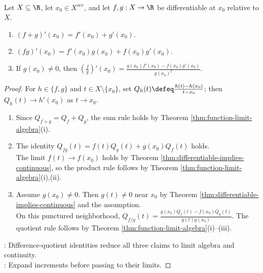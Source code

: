 \begin{theorem} \label{thm:derivative-algebra-rules} \\
Let $X\subseteq\R$, let $x_0\in X^{\operatorname{acc}}$, and let $f,g:X\to\R$ be differentiable at $x_0$ relative to $X$.
\begin{enumerate}[label=(\roman*)]
\setlength{\itemsep}{0pt}
\item $(f+g)'(x_0)=f'(x_0)+g'(x_0)$.
\item $(fg)'(x_0)=f'(x_0)g(x_0)+f(x_0)g'(x_0)$.
\item If $g(x_0)\neq0$, then $\left(\frac{f}{g}\right)'(x_0)=\frac{g(x_0)f'(x_0)-f(x_0)g'(x_0)}{g(x_0)^2}$.
\end{enumerate}
\begin{proof}
For $h\in\{f,g\}$ and $t\in X\setminus\{x_0\}$, set $Q_h(t)\defeq\frac{h(t)-h(x_0)}{t-x_0}$; then $Q_h(t)\to h'(x_0)$ as $t\to x_0$.
\begin{enumerate}[label=(\roman*)]
\setlength{\itemsep}{0pt}
\item Since $Q_{f+g}=Q_f+Q_g$, the sum rule holds by Theorem \ref{thm:function-limit-algebra}(i).
\item The identity $Q_{fg}(t)=f(t)Q_g(t)+g(x_0)Q_f(t)$ holds.\\
The limit $f(t)\to f(x_0)$ holds by Theorem \ref{thm:differentiable-implies-continuous}, so the product rule follows by Theorem \ref{thm:function-limit-algebra}(i),(ii).
\item Assume $g(x_0)\neq0$. Then $g(t)\neq0$ near $x_0$ by Theorem \ref{thm:differentiable-implies-continuous} and the assumption.\\
On this punctured neighborhood, $Q_{f/g}(t)=\frac{g(x_0)Q_f(t)-f(x_0)Q_g(t)}{g(t)g(x_0)}$. The quotient rule follows by Theorem \ref{thm:function-limit-algebra}(i)--(iii).
\end{enumerate}
: Difference-quotient identities reduce all three claims to limit algebra and continuity.\\
: Expand increments before passing to their limits.
\end{proof}
\end{theorem}

